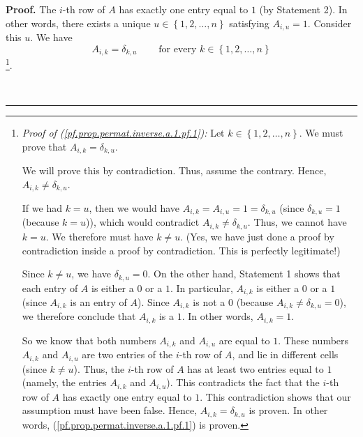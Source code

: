 \documentclass[numbers=enddot,12pt,final,onecolumn,notitlepage]{scrartcl}%
\theoremstyle{definition}
\newenvironment{proof}[1][Proof]{\noindent\textbf{#1.} }{\ \rule{0.5em}{0.5em}}
\begin{document}
\begin{proof}
The $i$-th row of $A$ has exactly one entry equal to $1$ (by Statement 2). In
other words, there exists a unique $u\in\left\{  1,2,\ldots,n\right\}  $
satisfying $A_{i,u}=1$. Consider this $u$. We have%
\begin{equation}
A_{i,k}=\delta_{k,u}\ \ \ \ \ \ \ \ \ \ \text{for every }k\in\left\{
1,2,\ldots,n\right\}  \label{pf.prop.permat.inverse.a.1.pf.1}%
\end{equation}
\footnote{\textit{Proof of (\ref{pf.prop.permat.inverse.a.1.pf.1}):} Let
$k\in\left\{  1,2,\ldots,n\right\}  $. We must prove that $A_{i,k}%
=\delta_{k,u}$.
\par
We will prove this by contradiction. Thus, assume the contrary. Hence,
$A_{i,k}\neq\delta_{k,u}$.
\par
If we had $k=u$, then we would have $A_{i,k}=A_{i,u}=1=\delta_{k,u}$ (since
$\delta_{k,u}=1$ (because $k=u$)), which would contradict $A_{i,k}\neq
\delta_{k,u}$. Thus, we cannot have $k=u$. We therefore must have $k\neq u$.
(Yes, we have just done a proof by contradiction inside a proof by
contradiction. This is perfectly legitimate!)
\par
Since $k\neq u$, we have $\delta_{k,u}=0$. On the other hand, Statement 1
shows that each entry of $A$ is either a $0$ or a $1$. In particular,
$A_{i,k}$ is either a $0$ or a $1$ (since $A_{i,k}$ is an entry of $A$). Since
$A_{i,k}$ is not a $0$ (because $A_{i,k}\neq\delta_{k,u}=0$), we therefore
conclude that $A_{i,k}$ is a $1$. In other words, $A_{i,k}=1$.
\par
So we know that both numbers $A_{i,k}$ and $A_{i,u}$ are equal to $1$. These
numbers $A_{i,k}$ and $A_{i,u}$ are two entries of the $i$-th row of $A$, and
lie in different cells (since $k\neq u$). Thus, the $i$-th row of $A$ has at
least two entries equal to $1$ (namely, the entries $A_{i,k}$ and $A_{i,u}$).
This contradicts the fact that the $i$-th row of $A$ has exactly one entry
equal to $1$. This contradiction shows that our assumption must have been
false. Hence, $A_{i,k}=\delta_{k,u}$ is proven. In other words,
(\ref{pf.prop.permat.inverse.a.1.pf.1}) is proven.}.


\end{proof}
\end{document}

